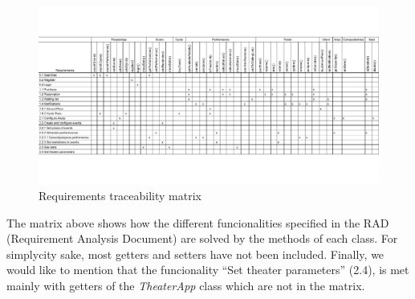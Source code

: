 \documentclass{article}
\begin{document}
\begin{figure}[h!]
    \centering
    \includegraphics[width=455pt]{../matrix/matrix}
    \caption{Requirements traceability matrix}
\end{figure}

The matrix above shows how the different funcionalities specified in the RAD (Requirement Analysis Document) are solved by the methods of each class. For simplycity sake, most getters and setters have not been included. Finally, we would like to mention that the funcionality ``Set theater parameters'' (2.4), is met mainly with getters of the \textit{TheaterApp} class which are not in the matrix.
\end{document}
